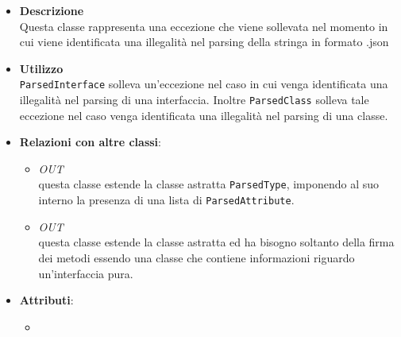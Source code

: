 \label{\nogloxy{swedesigner::server::project::ParsedException}}
\begin{figure}[h]
\centering
{}
\caption{}
\end{figure}
\FloatBarrier
\begin{itemize}
\item \textbf{Descrizione}\\
Questa classe rappresenta una eccezione che viene sollevata nel momento in cui viene identificata una illegalità nel parsing della stringa in formato .json
\item \textbf{Utilizzo}\\
\texttt{ParsedInterface} solleva un'eccezione nel caso in cui venga identificata una illegalità nel parsing di una interfaccia. Inoltre \texttt{ParsedClass} solleva tale eccezione nel caso venga identificata una illegalità nel parsing di una classe.
\item \textbf{Relazioni con altre classi}:
\begin{itemize}
\item \textit{OUT} \hyperref[\nogloxy{swedesigner::server::project::ParsedClass}]{}\\
questa classe estende la classe astratta \texttt{ParsedType}, imponendo al suo interno la presenza di una lista di \texttt{ParsedAttribute}. 
\item \textit{OUT} \hyperref[\nogloxy{swedesigner::server::project::ParsedInterface}]{}\\
questa classe estende la classe astratta  ed ha bisogno soltanto della firma dei metodi essendo una classe che contiene informazioni riguardo un'interfaccia pura.
\end{itemize}
\item \textbf{Attributi}:
\begin{itemize}
\item {}

\end{itemize}
\end{itemize}
